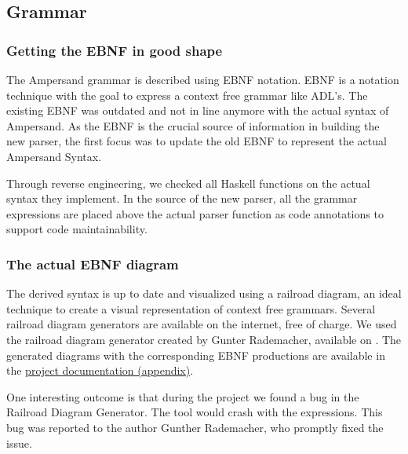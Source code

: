 
\subsection{Grammar}
\label{analysis:grammar}

\subsubsection{Getting the EBNF in good shape}
%
%
%
The Ampersand grammar is described using EBNF notation. 
EBNF is a notation technique with the goal to express a context free grammar like ADL's.
The existing EBNF was outdated and not in line anymore with the actual syntax of Ampersand.
As the EBNF is the crucial source of information in building the new parser, the first focus was to update the old EBNF to represent the actual Ampersand Syntax.

Through reverse engineering, we checked all Haskell functions on the actual syntax they implement.
In the source of the new parser, all the grammar expressions are placed above the actual parser function as code annotations to support code maintainability.

\subsubsection{The actual EBNF diagram}
The derived syntax is up to date and visualized using a railroad diagram, an ideal technique to create a visual representation of context free grammars.
Several railroad diagram generators are available on the internet, free of charge.
We used the railroad diagram generator created by Gunter Rademacher, available on .
The generated diagrams with the corresponding EBNF productions are available in the \hyperref[app:docs]{project documentation (appendix)}.

One interesting outcome is that during the project we found a bug in the Railroad Diagram Generator.
The tool would crash with the  expressions.
This bug was reported to the author Gunther Rademacher, who promptly fixed the issue.
